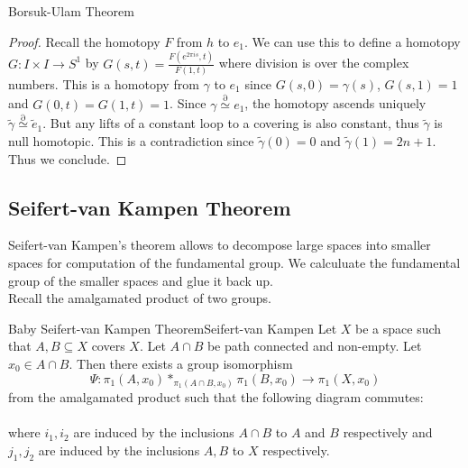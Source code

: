 \documentclass[a4paper]{article}
\begin{document}
\begin{prp}{Borsuk-Ulam Theorem}{}
\begin{proof}
Recall the homotopy $F$ from $h$ to $e_1$. We can use this to define a homotopy $G:I\times I\to S^1$ by $G(s,t)=\frac{F(e^{2\pi is},t)}{F(1,t)}$ where division is over the complex numbers. This is a homotopy from $\gamma$ to $e_1$ since $G(s,0)=\gamma(s)$, $G(s,1)=1$ and $G(0,t)=G(1,t)=1$. Since $\gamma\overset{\partial}{\simeq} e_1$, the homotopy ascends uniquely $\widetilde{\gamma}\overset{\partial}{\simeq}\widetilde{e}_1$. But any lifts of a constant loop to a covering is also constant, thus $\widetilde{\gamma}$ is null homotopic. This is a contradiction since $\widetilde{\gamma}(0)=0$ and $\widetilde{\gamma}(1)=2n+1$. Thus we conclude. 
\end{proof}
\end{prp}

\subsection{Seifert-van Kampen Theorem}
Seifert-van Kampen's theorem allows to decompose large spaces into smaller spaces for computation of the fundamental group. We calculuate the fundamental group of the smaller spaces and glue it back up. \\

Recall the amalgamated product of two groups. 

\begin{thm}{Baby Seifert-van Kampen Theorem}{Seifert-van Kampen} Let $X$ be a space such that $A,B\subseteq X$ covers $X$. Let $A\cap B$ be path connected and non-empty. Let $x_0\in A\cap B$. Then there exists a group isomorphism $$\Psi:\pi_1(A,x_0)\ast_{\pi_1(A\cap B,x_0)}\pi_1(B,x_0)\to\pi_1(X,x_0)$$ from the amalgamated product such that the following diagram commutes: \\
\\
where $i_1,i_2$ are induced by the inclusions $A\cap B$ to $A$ and $B$ respectively and $j_1,j_2$ are induced by the inclusions $A,B$ to $X$ respectively. 
\end{thm}
\end{document}
